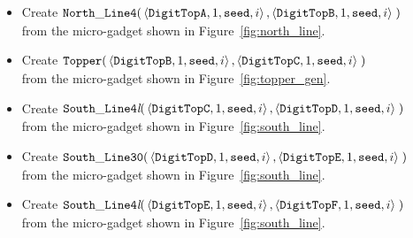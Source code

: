 \begin{itemize}
\begin{itemize}
        \item Create $\begin{aligned}[t]
            {\tt North\_Line4}(& \left\langle {\tt DigitTopA}, 1, {\tt seed}, i \right\rangle,
                                 \left\langle {\tt DigitTopB}, 1, {\tt seed}, i \right\rangle \;)
        \end{aligned}$\\from the micro-gadget shown in Figure~\ref{fig:north_line}.

        \item Create $\begin{aligned}[t]
            {\tt Topper}(& \left\langle {\tt DigitTopB}, 1, {\tt seed}, i \right\rangle,
                           \left\langle {\tt DigitTopC}, 1, {\tt seed}, i \right\rangle \;)
        \end{aligned}$\\from the micro-gadget shown in Figure~\ref{fig:topper_gen}.

        \item Create
        $\begin{aligned}[t]
            {\tt South\_Line4\textit{l}}(& \left\langle {\tt DigitTopC}, 1, {\tt seed}, i \right\rangle,
                                           \left\langle {\tt DigitTopD}, 1, {\tt seed}, i \right\rangle \;)
        \end{aligned}$\\from the micro-gadget shown in Figure~\ref{fig:south_line}.

        \item Create
        $\begin{aligned}[t]
            {\tt South\_Line30}(& \left\langle {\tt DigitTopD}, 1, {\tt seed}, i \right\rangle,
                                  \left\langle {\tt DigitTopE}, 1, {\tt seed}, i \right\rangle \;)
        \end{aligned}$\\from the micro-gadget shown in Figure~\ref{fig:south_line}.

        \item Create
        $\begin{aligned}[t]
            {\tt South\_Line4\textit{l}}(& \left\langle {\tt DigitTopE}, 1, {\tt seed}, i \right\rangle,
                                           \left\langle {\tt DigitTopF}, 1, {\tt seed}, i \right\rangle \;)
        \end{aligned}$\\ from the micro-gadget shown in Figure~\ref{fig:south_line}.


\end{itemize}
\end{itemize}
